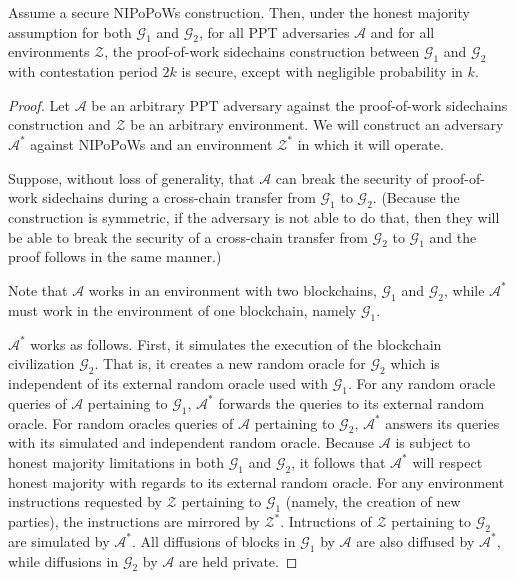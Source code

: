 \begin{theorem}
  Assume a secure NIPoPoWs construction. Then, under the honest majority
  assumption for both $\mathcal{G}_1$ and $\mathcal{G}_2$, for all PPT
  adversaries $\mathcal{A}$ and for all environments $\mathcal{Z}$, the
  proof-of-work sidechains construction between $\mathcal{G}_1$ and
  $\mathcal{G}_2$ with contestation period $2k$ is secure, except with
  negligible probability in $k$.
\end{theorem}
\begin{proof}
  Let $\mathcal{A}$ be an arbitrary PPT adversary against the proof-of-work
  sidechains construction and $\mathcal{Z}$ be an arbitrary environment. We will
  construct an adversary $\mathcal{A}^*$ against NIPoPoWs and an environment
  $\mathcal{Z}^*$ in which it will operate.

  Suppose, without loss of generality, that $\mathcal{A}$ can break the security
  of proof-of-work sidechains during a cross-chain transfer from $\mathcal{G}_1$
  to $\mathcal{G}_2$. (Because the construction is symmetric, if the adversary
  is not able to do that, then they will be able to break the security of a
  cross-chain transfer from $\mathcal{G}_2$ to $\mathcal{G}_1$ and the proof
  follows in the same manner.)

  Note that $\mathcal{A}$ works in an environment with two blockchains,
  $\mathcal{G}_1$ and $\mathcal{G}_2$, while $\mathcal{A}^*$ must work in the
  environment of one blockchain, namely $\mathcal{G}_1$.

  $\mathcal{A}^*$ works as follows. First, it simulates the execution of the
  blockchain civilization $\mathcal{G}_2$. That is, it creates a new random
  oracle for $\mathcal{G}_2$ which is independent of its external random oracle
  used with $\mathcal{G}_1$. For any random oracle queries of $\mathcal{A}$
  pertaining to $\mathcal{G}_1$, $\mathcal{A}^*$ forwards the queries to its
  external random oracle. For random oracles queries of $\mathcal{A}$ pertaining
  to $\mathcal{G}_2$, $\mathcal{A}^*$ answers its queries with its simulated
  and independent random oracle. Because $\mathcal{A}$ is subject to honest
  majority limitations in both $\mathcal{G}_1$ and $\mathcal{G}_2$, it follows
  that $\mathcal{A}^*$ will respect honest majority with regards to its external
  random oracle. For any environment instructions requested by $\mathcal{Z}$
  pertaining to $\mathcal{G}_1$ (namely, the creation of new parties), the
  instructions are mirrored by $\mathcal{Z}^*$. Intructions of $\mathcal{Z}$
  pertaining to $\mathcal{G}_2$ are simulated by $\mathcal{A}^*$. All diffusions
  of blocks in $\mathcal{G}_1$ by $\mathcal{A}$ are also diffused by
  $\mathcal{A}^*$, while diffusions in $\mathcal{G}_2$ by $\mathcal{A}$ are held
  private.


\end{proof}
